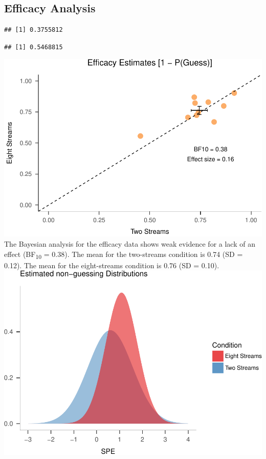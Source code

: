 \documentclass[,man]{apa6}
\theoremstyle{definition}
\theoremstyle{definition}
\theoremstyle{definition}
\theoremstyle{remark}
\begin{document}
\subsection{Efficacy Analysis}\label{efficacy-analysis}

\begin{verbatim}
## [1] 0.3755812
\end{verbatim}

\begin{verbatim}
## [1] 0.5468815
\end{verbatim}

\includegraphics{nStreams_Bayesian_files/figure-latex/unnamed-chunk-5-1.pdf}
The Bayesian analysis for the efficacy data shows weak evidence for a
lack of an effect (BF\textsubscript{10} = 0.38). The mean for the
two-streams condition is 0.74 (SD = 0.12). The mean for the
eight-streams condition is 0.76 (SD = 0.10).
\includegraphics{nStreams_Bayesian_files/figure-latex/unnamed-chunk-6-1.pdf}
\end{document}

